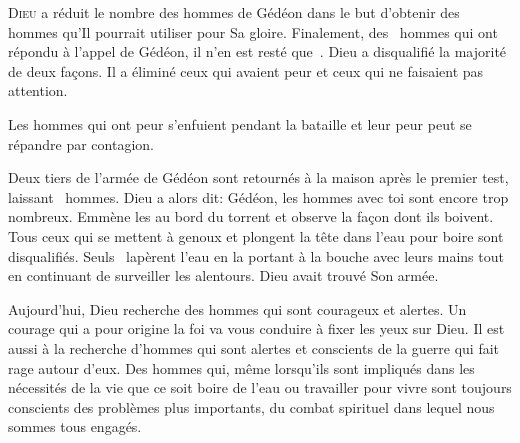 \dvrule








\lettrine{D}{ieu} a réduit le nombre des hommes de Gédéon
 dans le but d'obtenir des hommes qu'Il pourrait utiliser pour Sa gloire.
 Finalement, des ~hommes qui ont répondu à l'appel de Gédéon,
 il n'en est resté que~.
 Dieu a disqualifié la majorité de deux fa\c{c}ons.
 Il a éliminé ceux qui avaient peur et ceux qui ne faisaient pas attention.

Les hommes qui ont peur s'enfuient pendant la bataille et leur peur peut
 se répandre par contagion.


Deux tiers de l'armée de Gédéon sont retournés à la maison
 après le premier test, laissant ~hommes.
 Dieu a alors dit:
 \Og Gédéon, les hommes avec toi sont encore trop nombreux.
 Emmène les au bord du torrent et observe la fa\c{c}on dont ils boivent.
 Tous ceux qui se mettent à genoux et plongent la tête dans l'eau pour boire
 sont disqualifiés. \Fg{}
 Seuls ~lapèrent l'eau en la portant à la bouche avec leurs mains
 tout en continuant de surveiller les alentours. Dieu avait trouvé Son armée.

Aujourd'hui, Dieu recherche des hommes qui sont courageux et alertes.
 Un courage qui a pour origine la foi va vous conduire
 à fixer les yeux sur Dieu. Il est aussi à la recherche d'hommes
 qui sont alertes et conscients de la guerre qui fait rage autour d'eux.
 Des hommes qui, même lorsqu'ils sont impliqués dans les nécessités de la vie
 \ocadr que ce soit boire de l'eau ou travailler pour vivre \fcadr{}
 sont toujours conscients des problèmes plus importants,
 du combat spirituel dans lequel nous sommes tous engagés. 

